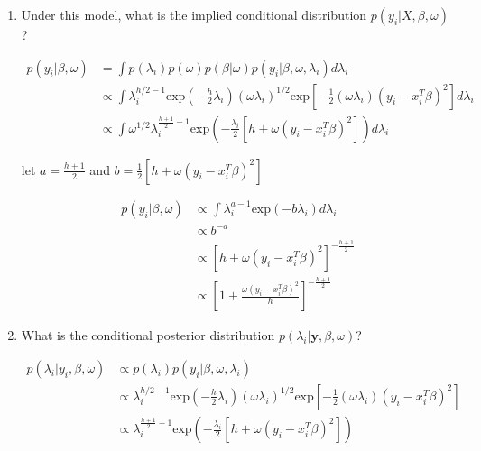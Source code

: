 \documentclass[10pt]{article}
\newcommand{\by}{\mathbf{y}}
\begin{document}
    \begin{enumerate}[label=(\Alph*)]

    \item Under this model, what is the implied conditional distribution $p(y_i | X, \beta, \omega)$?

      \begin{align*}
        p(y_i | \beta, \omega) &= \int p(\lambda_i) p(\omega) p(\beta | \omega) p(y_i | \beta, \omega, \lambda_i) d \lambda_i \\
         &\propto \int \lambda_i^{h/2 -1} \text{exp}\left(- \frac{h}{2} \lambda_i \right) (\omega \lambda_i)^{1/2} \text{exp}\left[-\frac{1}{2} (\omega \lambda_i)(y_i - x_i^T \beta)^2 \right] d\lambda_i \\
         &\propto \int \omega^{1/2} \lambda_i^{\frac{h+1}{2}-1} \text{exp}\left(-\frac{\lambda_i}{2} \left[h + \omega(y_i - x_i^T \beta)^2 \right] \right) d\lambda_i
      \end{align*}

      let $a = \frac{h+1}{2}$ and $b=\frac{1}{2} \left[h + \omega(y_i - x_i^T \beta)^2 \right]$

      \begin{align*}
        p(y_i | \beta, \omega) &\propto \int \lambda_i^{a-1} \text{exp}(-b \lambda_i) d \lambda_i \\
        & \propto b^{-a}\\
        & \propto \left[h + \omega(y_i - x_i^T \beta)^2 \right]^{-\frac{h+1}{2}} \\
        & \propto \left[1 + \frac{\omega(y_i - x_i^T \beta)^2}{h} \right]^{-\frac{h+1}{2}}
      \end{align*}

    \item What is the conditional posterior distribution $p(\lambda_i | \by, \beta, \omega)$?

      \begin{align*}
        p(\lambda_i | y_i, \beta, \omega) &\propto p(\lambda_i) p(y_i | \beta, \omega, \lambda_i) \\
        &\propto \lambda_i^{h/2 -1} \text{exp}\left(- \frac{h}{2} \lambda_i \right) (\omega \lambda_i)^{1/2} \text{exp}\left[-\frac{1}{2} (\omega \lambda_i)(y_i - x_i^T \beta)^2 \right] \\
        &\propto \lambda_i^{\frac{h+1}{2}-1} \text{exp}\left(-\frac{\lambda_i}{2} \left[h + \omega(y_i - x_i^T \beta)^2 \right] \right)
      \end{align*}


\end{enumerate}
\end{document}
